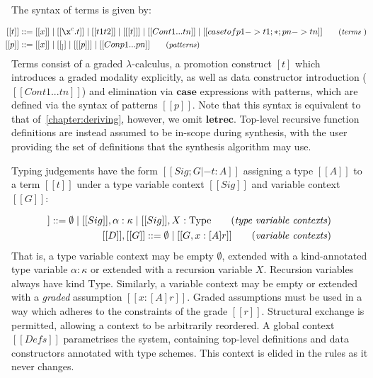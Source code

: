 The syntax of terms is given by:

\begin{align*}
        \hspace{-0.8em} [[ t ]] ::= \;
               & [[ x ]]
          \mid [[ \x ^ c . t ]]
          \mid [[ t1 t2 ]]
          \mid [[ [t] ]]
          \mid [[ Con t1 ... tn ]]
          \mid [[ case t of p1 -> t1 ; * ; pn -> tn  ]]
        {\small{\tag{\textit{terms} }}}
        \\
        \hspace{-0.8em} [[ p ]] ::= \;
               & [[ x ]]
          \mid [[ _ ]]
          \mid [[ [p] ]]
          \mid [[ Con p1 ... pn ]]
        {\small{\tag{\textit{patterns}}}}
\end{align*}
Terms consist of a graded $\lambda$-calculus, a promotion construct $[t]$ which
 introduces a graded modality explicitly, as well as data constructor
 introduction ($[[ Con t1 ... tn ]]$) and elimination via $\textbf{case}$
 expressions with patterns, which are defined via the syntax of patterns $[[ p
 ]]$. Note that this syntax is equivalent to that of~\ref{chapter:deriving},
 however, we omit $\textbf{letrec}$. Top-level recursive function definitions
 are instead assumed to be in-scope during synthesis, with the user providing
 the set of definitions that the synthesis algorithm may use. 

Typing judgements have the form $[[  Sig ; G |- t : A ]]$ assigning a type $[[ A
]]$ to a term $ [[ t ]]$ under a type variable context $[[ Sig ]]$ and variable context
$[[ G ]]$:

\begin{align*}
  [[ Sig ]] ::= \emptyset
  \mid [[ Sig ]], \alpha : \kappa
  \mid [[ Sig ]], X : \text{Type}
\tag{\textit{type variable contexts}}
\\
  [[ D ]], [[ G ]] ::= \emptyset
  \mid [[ G , x : [ A ] r ]]
\tag{\textit{variable contexts}}
\end{align*}
%
That is, a type variable context may be empty $\emptyset$, extended with a
kind-annotated type variable $\alpha : \kappa$ or extended with a recursion
variable $X$. Recursion variables always have kind $\text{Type}$. Similarly, a
variable context may be empty or extended with a \textit{graded} assumption $ [[
x : [A] r ]]$. Graded assumptions must be used in a way which adheres to the
constraints of the grade $[[ r ]]$. Structural exchange is permitted, allowing a
context to be arbitrarily reordered. A global context $[[ Defs ]]$ parametrises
the system, containing top-level definitions and data constructors annotated
with type schemes. This context is elided in the rules as it never changes.

